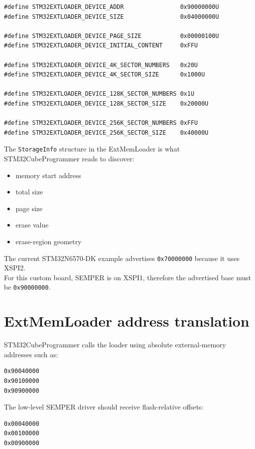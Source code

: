 \documentclass[10pt,a4paper,oneside]{report}
\providecommand{\tightlist}{\setlength{\itemsep}{1pt}\setlength{\parskip}{1pt}}
\begin{document}
\begin{verbatim}
#define STM32EXTLOADER_DEVICE_ADDR                0x90000000U
#define STM32EXTLOADER_DEVICE_SIZE                0x04000000U

#define STM32EXTLOADER_DEVICE_PAGE_SIZE           0x00000100U
#define STM32EXTLOADER_DEVICE_INITIAL_CONTENT     0xFFU

#define STM32EXTLOADER_DEVICE_4K_SECTOR_NUMBERS   0x20U
#define STM32EXTLOADER_DEVICE_4K_SECTOR_SIZE      0x1000U

#define STM32EXTLOADER_DEVICE_128K_SECTOR_NUMBERS 0x1U
#define STM32EXTLOADER_DEVICE_128K_SECTOR_SIZE    0x20000U

#define STM32EXTLOADER_DEVICE_256K_SECTOR_NUMBERS 0xFFU
#define STM32EXTLOADER_DEVICE_256K_SECTOR_SIZE    0x40000U
\end{verbatim}

The \texttt{StorageInfo} structure in the ExtMemLoader is what STM32CubeProgrammer reads to discover:

\begin{itemize}
\tightlist
\item
  memory start address
\item
  total size
\item
  page size
\item
  erase value
\item
  erase-region geometry
\end{itemize}

The current STM32N6570-DK example advertises \texttt{0x70000000} because it uses XSPI2.\\
For this custom board, SEMPER is on XSPI1, therefore the advertised base must be \texttt{0x90000000}.

\section{ExtMemLoader address translation}\label{wiki-reference-flash-layout-proposal--10-extmemloader-address-translation}

STM32CubeProgrammer calls the loader using absolute external-memory addresses such as:

\begin{verbatim}
0x90040000
0x90100000
0x90900000
\end{verbatim}

The low-level SEMPER driver should receive flash-relative offsets:

\begin{verbatim}
0x00040000
0x00100000
0x00900000
\end{verbatim}
\end{document}
